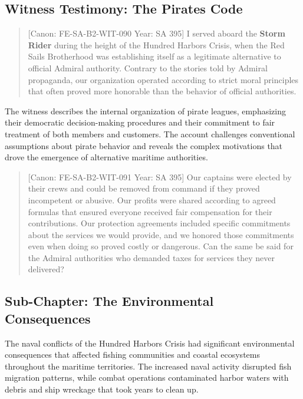 \subsection{Witness Testimony: The Pirate\textquotesingle s
Code}\label{witness-testimony-the-pirates-code}

\begin{quote}
{[}Canon: FE-SA-B2-WIT-090 \textbar{} Year: SA 395{]} I served aboard
the \textbf{Storm Rider} during the height of the Hundred Harbors
Crisis, when the Red Sails Brotherhood was establishing itself as a
legitimate alternative to official Admiral authority. Contrary to the
stories told by Admiral propaganda, our organization operated according
to strict moral principles that often proved more honorable than the
behavior of official authorities.
\end{quote}

The witness describes the internal organization of pirate leagues,
emphasizing their democratic decision-making procedures and their
commitment to fair treatment of both members and customers. The account
challenges conventional assumptions about pirate behavior and reveals
the complex motivations that drove the emergence of alternative maritime
authorities.

\begin{quote}
{[}Canon: FE-SA-B2-WIT-091 \textbar{} Year: SA 395{]} Our captains were
elected by their crews and could be removed from command if they proved
incompetent or abusive. Our profits were shared according to agreed
formulas that ensured everyone received fair compensation for their
contributions. Our protection agreements included specific commitments
about the services we would provide, and we honored those commitments
even when doing so proved costly or dangerous. Can the same be said for
the Admiral authorities who demanded taxes for services they never
delivered?
\end{quote}

\subsection{Sub-Chapter: The Environmental
Consequences}\label{sub-chapter-the-environmental-consequences}

The naval conflicts of the Hundred Harbors Crisis had significant
environmental consequences that affected fishing communities and coastal
ecosystems throughout the maritime territories. The increased naval
activity disrupted fish migration patterns, while combat operations
contaminated harbor waters with debris and ship wreckage that took years
to clean up.

